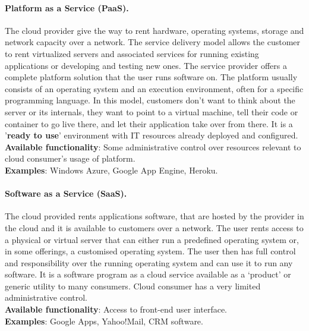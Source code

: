 	
\paragraph{Platform as a Service (PaaS).} The cloud provider give the way to rent hardware, operating systems, storage and network capacity over a network. The service delivery model allows the customer to rent virtualized servers and associated services for running existing applications or developing and testing new ones. The service provider offers a complete platform solution that the user runs software on. The platform usually consists of an operating system and an execution environment, often for a specific programming language.  In this model, customers don’t want to think about the server or its internals, they want to point to a virtual machine, tell their code or container to go live there, and let their application take over from there. It is a '\textbf{ready to use}’ environment with IT resources already deployed and configured. \\
\textbf{Available functionality}: Some administrative control over resources relevant to cloud consumer’s usage of platform.\\
\textbf{Examples}: Windows Azure, Google App Engine, Heroku.

		
\paragraph{Software as a Service (SaaS).} The cloud provided rents applications software, that are hosted by the provider in the cloud and it is available to customers over a network. The user rents access to a physical or virtual server that can either run a predefined operating system or, in some offerings, a customised operating system. The user then has full control and responsibility over the running operating system and can use it to run any software. It is a software program as a cloud service available as a ‘product’ or generic utility to many consumers. Cloud consumer has a very limited administrative control.  \\
\textbf{Available functionality}: Access to front-end user interface. \\
\textbf{Examples}: Google Apps, Yahoo!Mail, CRM software.


